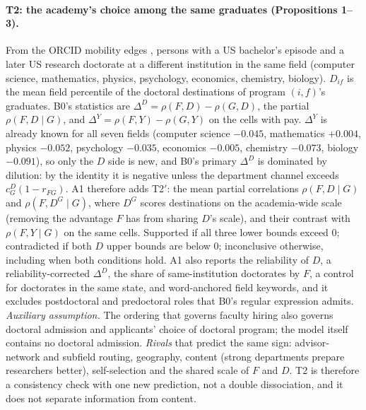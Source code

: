 \paragraph{T2: the academy's choice among the same graduates (Propositions 1--3).} From the ORCID mobility edges
\citep{li2026orcid}, persons with a US bachelor's episode and a later US research doctorate at a different
institution in the same field (computer science, mathematics, physics, psychology, economics, chemistry, biology).
$D_{if}$ is the mean field percentile of the doctoral destinations of program $(i,f)$'s graduates. B0's statistics
are $\Delta^D=\rho(F,D)-\rho(G,D)$, the partial $\rho(F,D\mid G)$, and $\Delta^Y=\rho(F,Y)-\rho(G,Y)$ on the cells
with pay. $\Delta^Y$ is already known for all seven fields (computer science $-0.045$, mathematics $+0.004$,
physics $-0.052$, psychology $-0.035$, economics $-0.005$, chemistry $-0.073$, biology $-0.091$), so only the $D$
side is new, and B0's primary $\Delta^D$ is dominated by dilution: by the identity it is negative unless the
department channel exceeds $c^D_G(1-r_{FG})$. A1 therefore adds T2$'$: the mean partial correlations
$\rho(F,D\mid G)$ and $\rho(F,D^G\mid G)$, where $D^G$ scores destinations on the academia-wide scale (removing the
advantage $F$ has from sharing $D$'s scale), and their contrast with $\rho(F,Y\mid G)$ on the same cells. Supported
if all three lower bounds exceed 0; contradicted if both $D$ upper bounds are below 0; inconclusive otherwise,
including when both conditions hold. A1 also reports the reliability of $D$, a reliability-corrected $\Delta^D$, the
share of same-institution doctorates by $F$, a control for doctorates in the same state, and word-anchored field
keywords, and it excludes postdoctoral and predoctoral roles that B0's regular expression admits.
\emph{Auxiliary assumption.} The ordering that governs faculty hiring also governs doctoral admission and
applicants' choice of doctoral program; the model itself contains no doctoral admission. \emph{Rivals} that
predict the same sign: advisor-network and subfield routing, geography, content (strong departments prepare
researchers better), self-selection and the shared scale of $F$ and $D$. T2 is therefore a consistency check
with one new prediction, not a double dissociation, and it does not separate information from content.

